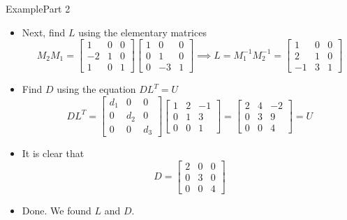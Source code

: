 \documentclass[10pt]{beamer}
\begin{document}

\begin{frame}{Example}{Part 2}

\begin{itemize}
    \item Next, find $L$ using the elementary matrices 
    $$
    M_2M_1 = \begin{bmatrix}
        1 & 0 & 0\\
        -2 & 1 & 0 \\
        1 & 0 & 1
    \end{bmatrix}\begin{bmatrix}
        1 & 0 & 0\\
        0 & 1 & 0 \\
        0 & -3 & 1
    \end{bmatrix}\implies L=M_1^{-1}M_2^{-1}=\begin{bmatrix}
        1 & 0 & 0\\
        2 & 1 & 0\\
        -1 & 3 & 1
    \end{bmatrix}
    $$
    \item Find $D$ using the equation $DL^T=U$
    $$
    DL^T=
    \begin{bmatrix}
        d_1 & 0 & 0\\
        0 & d_2 & 0\\
        0 & 0 & d_3
    \end{bmatrix}\begin{bmatrix}
        1 & 2 & -1\\
        0 & 1 & 3\\
        0 & 0 & 1
    \end{bmatrix}=    \begin{bmatrix}
        2 & 4 & -2\\
        0 & 3 & 9 \\
        0 & 0 & 4
    \end{bmatrix}=U
    $$
    \item It is clear that 
    $$
        D = \begin{bmatrix}
            2 & 0 & 0\\
            0 & 3 & 0 \\
            0 & 0 & 4
        \end{bmatrix}
    $$
    \item Done. We found $L$ and $D$.
\end{itemize}
\end{frame}
\end{document}
